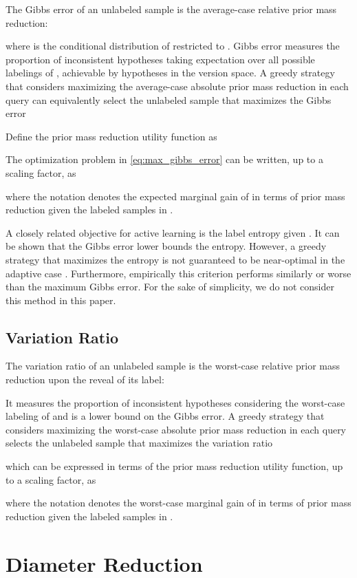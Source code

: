 \documentclass[runningheads, envcountsame, a4paper]{llncs}
\begin{document}
The Gibbs error \cite{Cuong13} of an unlabeled sample  is the average-case relative prior mass reduction:

where  is the conditional distribution of  restricted to .
Gibbs error measures the proportion of inconsistent hypotheses taking expectation over all possible labelings of , achievable by hypotheses in the version space.
A greedy strategy that considers maximizing the average-case absolute prior mass reduction in each query can equivalently select the unlabeled sample that maximizes the Gibbs error


Define the prior mass reduction utility function as

The optimization problem in \eqref{eq:max_gibbs_error} can be written, up to a scaling factor, as

where the notation  denotes the expected marginal gain of  in terms of prior mass reduction given the labeled samples in .

A closely related objective for active learning is the label entropy given . It can be shown that the Gibbs error lower bounds the entropy. However, a greedy strategy that maximizes the entropy is not guaranteed to be near-optimal in the adaptive case \cite{Cuong14}. Furthermore, empirically this criterion performs similarly or worse than the maximum Gibbs error. For the sake of simplicity, we do not consider this method in this paper.


\subsection{Variation Ratio}
\label{sec:variation_ratio}
The variation ratio of an unlabeled sample  is the worst-case relative prior mass reduction upon the reveal of its label:

It measures the proportion of inconsistent hypotheses considering the worst-case labeling of  and is a lower bound on the Gibbs error. A greedy strategy that considers maximizing the worst-case absolute prior mass reduction in each query selects the unlabeled sample that maximizes the variation ratio

which can be expressed in terms of the prior mass reduction utility function, up to a scaling factor, as

where the notation  denotes the worst-case marginal gain of  in terms of prior mass reduction given the labeled samples in .




\section{Diameter Reduction}
\label{sec:diameter_reduction}
\end{document}
